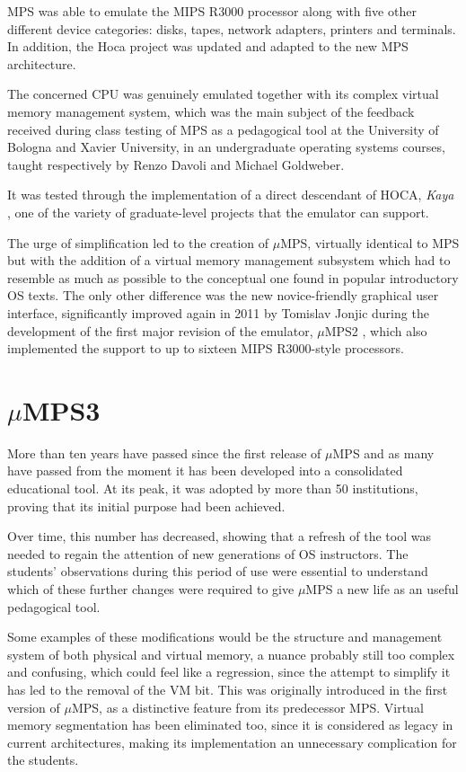 \documentclass[12pt,a4paper,openright,twoside]{report}
\begin{document}
MPS was able to emulate the MIPS R3000 processor along with five other different device categories: disks, tapes, network adapters, printers and terminals.
In addition, the Hoca project was updated and adapted to the new MPS architecture.

The concerned CPU was genuinely emulated together with its complex virtual memory management system, which was the main subject of the feedback received during class testing of MPS as a pedagogical tool at the University of Bologna and Xavier University, in an undergraduate operating systems courses, taught respectively by Renzo Davoli and Michael Goldweber.

It was tested through the implementation of a direct descendant of HOCA, \textit{Kaya} \cite{kaya}, one of the variety of graduate-level projects that the emulator can support.

The urge of simplification led to the creation of $\mu$MPS, virtually identical to MPS but with the addition of a virtual memory management subsystem which had to resemble as much as possible to the conceptual one found in popular introductory OS texts.
The only other difference was the new novice-friendly graphical user interface, significantly improved again in 2011 by Tomislav Jonjic during the development of the first major revision of the emulator, $\mu$MPS2 \cite{umps2}, which also implemented the support to up to sixteen MIPS R3000-style processors.

\section{$\mu$MPS3}
More than ten years have passed since the first release of $\mu$MPS and as many have passed from the moment it has been developed into a consolidated educational tool.
At its peak, it was adopted by more than 50 institutions, proving that its initial purpose had been achieved.

Over time, this number has decreased, showing that a refresh of the tool was needed to regain the attention of new generations of OS instructors.
The students' observations during this period of use were essential to understand which of these further changes were required to give $\mu$MPS a new life as an useful pedagogical tool.

Some examples of these modifications would be the structure and management system of both physical and virtual memory, a nuance probably still too complex and confusing, which could feel like a regression, since the attempt to simplify it has led to the removal of the VM bit.
This was originally introduced in the first version of $\mu$MPS, as a distinctive feature from its predecessor MPS.
Virtual memory segmentation has been eliminated too, since it is considered as legacy in current architectures, making its implementation an unnecessary complication for the students.
\end{document}
